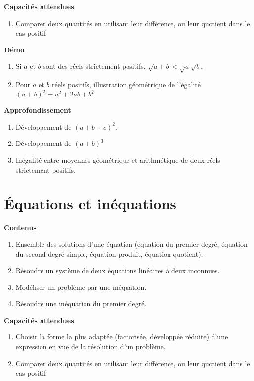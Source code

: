 \documentclass[10pt,a4paper]{article}
\begin{document}
\textbf{Capacités attendues}

\begin{enumerate}
\item  Comparer deux quantités en utilisant leur différence, ou leur quotient dans le cas positif
\end{enumerate}

\textbf{Démo}

\begin{enumerate}
\item Si $a$ et $b$ sont des réels strictement positifs, $\sqrt{a+b} < \sqrt{a}\sqrt{b}$.
\item Pour $a$ et $b$ réels positifs, illustration géométrique de l'égalité $(a + b)^2= a^2+ 2ab + b^2$
\end{enumerate}


\textbf{Approfondissement}

\begin{enumerate}
\item Développement de $(a + b + c)^2$.
\item Développement de $(a + b)^3$
\item Inégalité entre moyennes géométrique et arithmétique de deux réels strictement positifs.
\end{enumerate}




\section{Équations et inéquations}

\textbf{Contenus}

\begin{enumerate}
\item Ensemble des solutions d'une équation (équation du premier degré, équation du second degré simple, équation-produit, équation-quotient).
\item  Résoudre un système de deux équations linéaires à deux inconnues.
\item  Modéliser un problème par une inéquation.
\item  Résoudre une inéquation du premier degré.
\end{enumerate}


\textbf{Capacités attendues}

\begin{enumerate}
\item Choisir la forme la plus adaptée (factorisée, développée réduite) d'une expression en vue de la résolution d'un problème.
\item  Comparer deux quantités en utilisant leur différence, ou leur quotient dans le cas positif
\end{enumerate}
\end{document}

